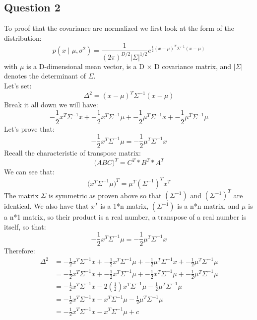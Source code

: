 \documentclass{article}
\begin{document}
    \subsection{Question 2}
        To proof that the covariance are normalized we first look at the form of the distribution:
        $$
            p(x\mid \mu, \sigma^2) = \frac{1}{(2\pi)^{D/2} |\Sigma| ^ {1/2}} e^{ \frac{1}{2}(x-\mu)^T \Sigma ^{-1}(x-\mu)}
        $$
        with $\mu$ is a D-dimensional mean vector, is a D × D covariance matrix, and $|\Sigma|$ denotes the determinant of $\Sigma$. \\
        Let's set:
        $$
          \Delta ^2 = ( x - \mu )^T \Sigma ^{-1} ( x - \mu )
        $$
        Break it all down we will have:
        $$
            -\frac{1}{2} x^T \Sigma ^{-1} x + -\frac{1}{2} x^T \Sigma ^{-1} \mu + -\frac{1}{2} \mu ^T \Sigma ^{-1} x + -\frac{1}{2} \mu^T \Sigma ^{-1} \mu
        $$
        Let's prove that:
        $$
            -\frac{1}{2} x^T \Sigma ^{-1} \mu  = -\frac{1}{2} \mu ^T \Sigma ^{-1} x
        $$
        Recall the characteristic of transpose matrix:
        $$
            \big( ABC \big)^T = C^T * B^T * A^T
        $$
        We can see that:
        $$
            \Big(x^T \Sigma ^{-1} \mu \Big)^T = \mu ^T (\Sigma ^{-1})^T x^T
        $$
        The matrix $\Sigma$ is symmetric as proven above so that $(\Sigma ^{-1})$ and $(\Sigma ^{-1})^T$ are identical.  We also have that $x^T$ is a 1*n matrix, $(\Sigma ^{-1})$ is a n*n matrix, and $\mu$ is a n*1 matrix, so their product is a real number, a transpose of a real number is itself, so that:
        $$
            -\frac{1}{2} x^T \Sigma ^{-1} \mu  = -\frac{1}{2} \mu ^T \Sigma ^{-1} x
        $$
        Therefore:
        \begin{equation}
            \begin{split}
                \Delta ^ 2 & = -\frac{1}{2} x^T \Sigma ^{-1} x + -\frac{1}{2} x^T \Sigma ^{-1} \mu + -\frac{1}{2} \mu ^T \Sigma ^{-1} x + -\frac{1}{2} \mu^T \Sigma ^{-1} \mu \\
                    & = -\frac{1}{2} x^T \Sigma ^{-1} x + -\frac{1}{2} x^T \Sigma ^{-1} \mu + -\frac{1}{2} x^T \Sigma ^{-1} \mu + -\frac{1}{2} \mu^T \Sigma ^{-1} \mu \\
                    & = -\frac{1}{2} x^T \Sigma ^{-1} x - 2(\frac{1}{2}) x^T \Sigma ^{-1} \mu -\frac{1}{2} \mu^T \Sigma ^{-1} \mu \\
                    & = -\frac{1}{2} x^T \Sigma ^{-1} x - x^T \Sigma ^{-1} \mu -\frac{1}{2} \mu^T \Sigma ^{-1} \mu \\
                    & = -\frac{1}{2} x^T \Sigma ^{-1} x - x^T \Sigma ^{-1} \mu + c
            \end{split}
        \end{equation}
\end{document}
